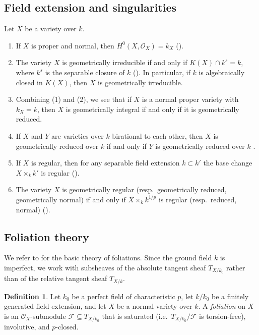 \documentclass[reqno,oneside]{amsart}
\theoremstyle{definition}
\newtheorem{definition}[theorem]{Definition}
\theoremstyle{plain}
\numberwithin{equation}{section}
\begin{document}
\subsection{Field extension and singularities}\label{section-field-extension}%
Let $X$ be a variety over $k$.
\begin{enumerate}
  \item If $X$ is proper and normal, then $H^0(X, \mathcal{O}_X)=k_X$ (\cite[Proposition~2.1]{tanaka_invariants_2021}).
  \item The variety $X$ is geometrically irreducible if and only if $K(X) \cap k^s = k$, where $k^s$ is the separable closure of $k$ (\cite[Corollary~3.2.14]{Liu-AGAC}).
    In particular, if $k$ is algebraically closed in $K(X)$, then $X$ is geometrically irreducible.
  \item Combining (1) and (2), we see that if $X$ is a normal proper variety with $k_X=k$, then $X$ is geometrically integral if and only if it is geometrically reduced.
  \item If $X$ and $Y$ are varieties over $k$ birational to each other, then $X$ is geometrically reduced over $k$ if and only if $Y$ is geometrically reduced over $k$ \cite[Proposition~2.12]{tanaka_invariants_2021}.
  \item If $X$ is regular, then for any separable field extension $k \subset k'$ the base change $X \times_k k'$ is regular (\cite[Lemma~2.6]{tanaka_invariants_2021}).
   \item The variety $X$ is geometrically regular (resp.\ geometrically reduced, geometrically normal) if and only if $X \times_k k^{1/p}$ is regular (resp.\ reduced, normal) (\cite[Proposition~2.10]{tanaka_invariants_2021}).
\end{enumerate}


\subsection{Foliation theory}%
We refer to \cite{Rudakov-Shafarevich-1976,Ekedahl87F,MP97} for the basic theory of foliations.
Since the ground field $k$ is imperfect, we work with subsheaves of the absolute tangent sheaf $T_{X/k_0}$ rather than of the relative tangent sheaf $T_{X/k}$.

\begin{definition}%
  Let $k_0$ be a perfect field of characteristic $p$, let $k/k_0$ be a finitely generated field extension, and let $X$ be a normal variety over $k$.
  A \emph{foliation} on $X$ is an $\mathcal O_X$-submodule $\mathcal F\subseteq T_{X/k_0}$ that is saturated (i.e.\ $T_{X/k_0}/\mathcal F$ is torsion-free), involutive, and $p$-closed.
\end{definition}
\end{document}
